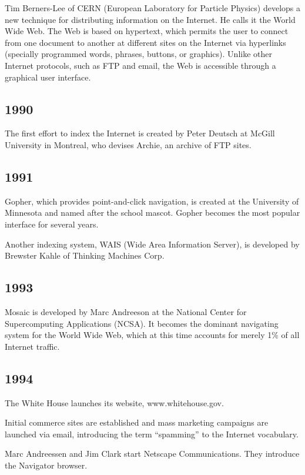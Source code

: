 \documentclass[letterpaper,12pt,english]{sphinxmanual}
\begin{document}
Tim Berners-Lee of CERN (European Laboratory for Particle Physics) develops a new technique for distributing information on the Internet. He calls it the World Wide Web. The Web is based on hypertext, which permits the user to connect from one document to another at different sites on the Internet via hyperlinks (specially programmed words, phrases, buttons, or graphics). Unlike other Internet protocols, such as FTP and email, the Web is accessible through a graphical user interface.


\subsection{1990}
\label{network-timeline:id10}
The first effort to index the Internet is created by Peter Deutsch at McGill University in Montreal, who devises Archie, an archive of FTP sites.


\subsection{1991}
\label{network-timeline:id11}
Gopher, which provides point-and-click navigation, is created at the University of Minnesota and named after the school mascot. Gopher becomes the most popular interface for several years.

Another indexing system, WAIS (Wide Area Information Server), is developed by Brewster Kahle of Thinking Machines Corp.


\subsection{1993}
\label{network-timeline:id12}
Mosaic is developed by Marc Andreeson at the National Center for Supercomputing Applications (NCSA). It becomes the dominant navigating system for the World Wide Web, which at this time accounts for merely 1\% of all Internet traffic.


\subsection{1994}
\label{network-timeline:id13}
The White House launches its website, www.whitehouse.gov.

Initial commerce sites are established and mass marketing campaigns are launched via email, introducing the term “spamming” to the Internet vocabulary.

Marc Andreessen and Jim Clark start Netscape Communications. They introduce the Navigator browser.
\end{document}
